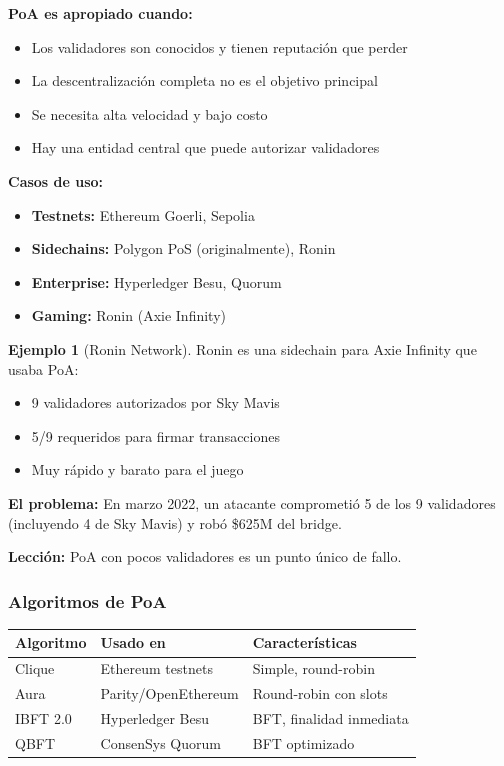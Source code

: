 \documentclass[11pt,a4paper,twoside,openright]{book}
\theoremstyle{definition}
\newtheorem{example}{Ejemplo}[chapter]
\theoremstyle{plain}
\theoremstyle{remark}
\begin{document}
\begin{keyidea}
\textbf{PoA es apropiado cuando:}
\begin{itemize}
    \item Los validadores son conocidos y tienen reputación que perder
    \item La descentralización completa no es el objetivo principal
    \item Se necesita alta velocidad y bajo costo
    \item Hay una entidad central que puede autorizar validadores
\end{itemize}

\textbf{Casos de uso:}
\begin{itemize}
    \item \textbf{Testnets:} Ethereum Goerli, Sepolia
    \item \textbf{Sidechains:} Polygon PoS (originalmente), Ronin
    \item \textbf{Enterprise:} Hyperledger Besu, Quorum
    \item \textbf{Gaming:} Ronin (Axie Infinity)
\end{itemize}
\end{keyidea}

\begin{example}[Ronin Network]
Ronin es una sidechain para Axie Infinity que usaba PoA:
\begin{itemize}
    \item 9 validadores autorizados por Sky Mavis
    \item 5/9 requeridos para firmar transacciones
    \item Muy rápido y barato para el juego
\end{itemize}

\textbf{El problema:} En marzo 2022, un atacante comprometió 5 de los 9 validadores (incluyendo 4 de Sky Mavis) y robó \$625M del bridge.

\textbf{Lección:} PoA con pocos validadores es un punto único de fallo.
\end{example}

\subsubsection{Algoritmos de PoA}

\begin{center}
\begin{tabular}{lll}
\toprule
\textbf{Algoritmo} & \textbf{Usado en} & \textbf{Características} \\
\midrule
Clique & Ethereum testnets & Simple, round-robin \\
Aura & Parity/OpenEthereum & Round-robin con slots \\
IBFT 2.0 & Hyperledger Besu & BFT, finalidad inmediata \\
QBFT & ConsenSys Quorum & BFT optimizado \\
\bottomrule
\end{tabular}
\end{center}
\end{document}
